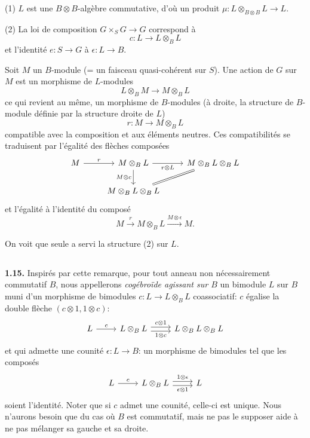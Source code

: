 \documentclass[12pt,a4paper]{article}
\theoremstyle{plain}
\theoremstyle{definition}
\theoremstyle{remark}
\begin{document}
(1) $L$ est une $B \otimes B$-algèbre commutative, d'où un produit $\mu : L \otimes_{B \otimes B} L \to L$.

(2) La loi de composition $G \times_S G \to G$ correspond à
\[
c : L \to L \otimes_B L
\]
et l'identité $e : S \to G$ à $\epsilon : L \to B$.

Soit $M$ un $B$-module (= un faisceau quasi-cohérent sur $S$). Une action de $G$ sur $M$ est un morphisme de $L$-modules
\[
L \otimes_B M \to M \otimes_B L
\]
ce qui revient au même, un morphisme de $B$-modules (à droite, la structure de $B$-module définie par la structure droite de $L$)
\[
r : M \to M \otimes_B L
\]
compatible avec la composition et aux éléments neutres. Ces compatibilités se traduisent par l'égalité des flèches composées
\begin{equation}\label{eq:1.14.1}
\begin{tikzcd}
M \arrow[r, "r"] & M \otimes_B L \arrow[r, "r \otimes L"'] \arrow[d, "M \otimes c"'] & M \otimes_B L \otimes_B L \\
& M \otimes_B L \otimes_B L \arrow[ru, equal]
\end{tikzcd}
\end{equation}
et l'égalité à l'identité du composé
\begin{equation}\label{eq:1.14.2}
M \xrightarrow{r} M \otimes_B L \xrightarrow{M \otimes \epsilon} M.
\end{equation}

On voit que seule a servi la structure (2) sur $L$.

\subsection{}

\textbf{1.15.} Inspirés par cette remarque, pour tout anneau non nécessairement commutatif $B$, nous appellerons \emph{cogébroïde agissant sur $B$} un bimodule $L$ sur $B$ muni d'un morphisme de bimodules $c : L \to L \otimes_B L$ coassociatif: $c$ égalise la double flèche $(c \otimes 1, 1 \otimes c)$:
\[
\begin{tikzcd}
L \arrow[r, "c"] & L \otimes_B L \arrow[r, shift left, "c \otimes 1"] \arrow[r, shift right, "1 \otimes c"'] & L \otimes_B L \otimes_B L
\end{tikzcd}
\]
et qui admette une counité $\epsilon : L \to B$: un morphisme de bimodules tel que les composés
\[
\begin{tikzcd}
L \arrow[r, "c"] & L \otimes_B L \arrow[r, "\epsilon \otimes 1"', shift right] \arrow[r, "1 \otimes \epsilon", shift left] & L
\end{tikzcd}
\]
soient l'identité. Noter que si $c$ admet une counité, celle-ci est unique. Nous n'aurons besoin que du cas où $B$ est commutatif, mais ne pas le supposer aide à ne pas mélanger sa gauche et sa droite.
\end{document}
